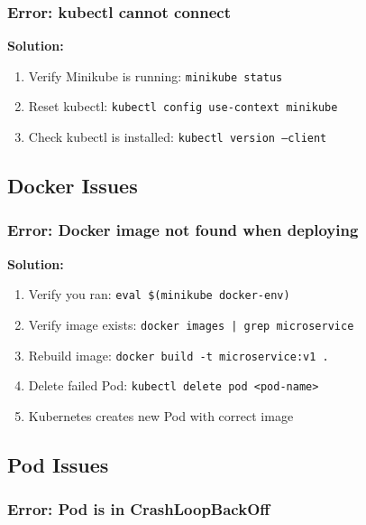 \documentclass[12pt,a4paper]{article}
\begin{document}
\subsubsection{Error: kubectl cannot connect}

\begin{warningbox}
\textbf{Solution:}
\begin{enumerate}
    \item Verify Minikube is running: \texttt{minikube status}
    \item Reset kubectl: \texttt{kubectl config use-context minikube}
    \item Check kubectl is installed: \texttt{kubectl version --client}
\end{enumerate}
\end{warningbox}

\subsection{Docker Issues}

\subsubsection{Error: Docker image not found when deploying}

\begin{warningbox}
\textbf{Solution:}
\begin{enumerate}
    \item Verify you ran: \texttt{eval \$(minikube docker-env)}
    \item Verify image exists: \texttt{docker images | grep microservice}
    \item Rebuild image: \texttt{docker build -t microservice:v1 .}
    \item Delete failed Pod: \texttt{kubectl delete pod <pod-name>}
    \item Kubernetes creates new Pod with correct image
\end{enumerate}
\end{warningbox}

\subsection{Pod Issues}

\subsubsection{Error: Pod is in CrashLoopBackOff}
\end{document}
